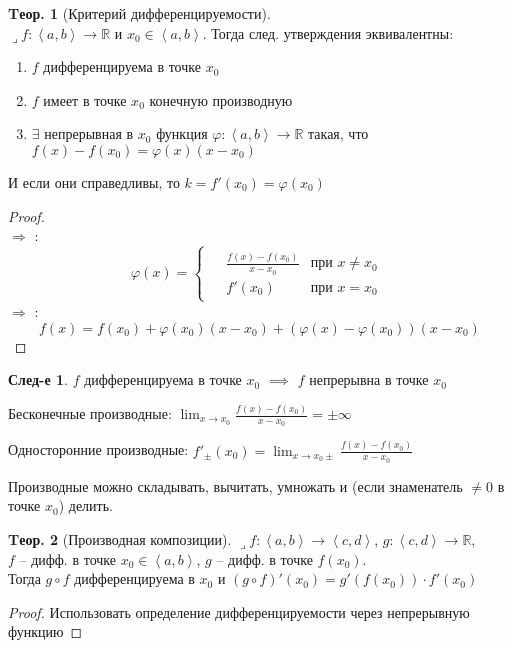 \documentclass[a4paper,12pt]{article}
\numberwithin{figure}{section}
\theoremstyle{definition}
\newtheorem{theorem}{Tеор.}[section]
\newtheorem*{corollary}{След-е} %
\def\DS{\displaystyle}
\def\RR{\mathbb{R}}
\def\on{\!:}
\def\intab{\left<a,b\right>}
\def\circleone{\ding{192}\space}
\def\circletwo{\ding{193}\space}
\def\circlethree{\ding{194}\space}
\def\lets{{\huge$\lrcorner$}\space}
\begin{document}
\begin{theorem}[Критерий дифференцируемости] ~\\
	\lets $f\on \intab\to\RR$ и $x_0\in\intab$.
	Тогда след. утверждения эквивалентны:
	\begin{enumerate}
		\item $f$ дифференцируема в точке $x_0$
		\item $f$ имеет в точке $x_0$ конечную производную
		\item $\exists$ непрерывная в $x_0$ функция $\varphi\on\intab\to\RR$
			  такая, что $f(x)-f(x_0) = \varphi(x)(x-x_0)$
	\end{enumerate}
	И если они справедливы, то $k=f'(x_0)=\varphi(x_0)$
\end{theorem}
\begin{proof}
	~\\
	\circletwo $\Rightarrow$ \circlethree: \[
		\varphi(x) = \begin{cases}\begin{aligned}
			& \frac{f(x)-f(x_0)}{x-x_0}  & \text{при } x \ne x_0 \\
			& f'(x_0)                    & \text{при } x=x_0
		\end{aligned}
		\end{cases}
	\]
	\circlethree $\Rightarrow$ \circleone: \[
		f(x) = f(x_0) + \varphi(x_0)(x-x_0) + \left( \varphi(x)-\varphi(x_0) \right) (x-x_0)
	\]
\end{proof}


\begin{corollary}
	$f$ дифференцируема в точке $x_0$ $\implies$ $f$ непрерывна в точке $x_0$
\end{corollary}


Бесконечные производные:
$\DS \lim_{x\to x_0}\frac{f(x)-f(x_0)}{x-x_0} = \pm\infty$

Односторонние производные:
$\DS f'_{\pm}(x_0) = \lim_{x\to x_0\pm}\frac{f(x)-f(x_0)}{x-x_0}$

Производные можно складывать, вычитать, умножать
и (если знаменатель $\ne0$ в точке $x_0$) делить.


\begin{theorem}[Производная композиции]
	\def\intcd{\left<c,d\right>}
	\lets $f\on \intab \to \intcd$,	\medspace $g\on \intcd \to \RR$,
	\\ $f$ -- дифф. в точке $x_0 \in\intab$, \medspace $g$ -- дифф. в точке $f(x_0)$.
	\\ Тогда $g \circ f$ дифференцируема в $x_0$
	и $(g \circ f)'(x_0) = g'(f(x_0)) \cdot f'(x_0)$
\end{theorem}
\begin{proof}
	Использовать определение дифференцируемости
	\circlethree через непрерывную функцию
\end{proof}
\end{document}
